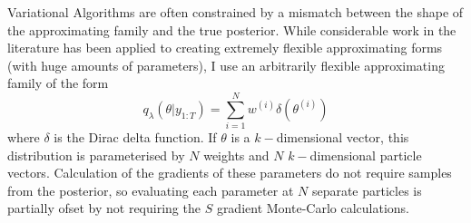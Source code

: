 \documentclass[
12pt, %
onehalfspacing, %
nohyperref, %
headsepline, %
chapterinoneline, %
]{MastersDoctoralThesis} %
\begin{document}
Variational Algorithms are often constrained by a mismatch between the shape of the approximating family and the true posterior. While considerable work in the literature has been applied to creating extremely flexible approximating forms (with huge amounts of parameters), I use an arbitrarily flexible approximating family of the form
\begin{equation}
\label{Particle:Q}
q_{\lambda}(\theta | y_{1:T}) = \sum_{i=1}^N w^{(i)} \delta(\theta^{(i)})
\end{equation}
where $\delta$ is the Dirac delta function. If $\theta$ is a $k-$dimensional vector, this distribution is parameterised by $N$ weights and $N$ $k-$dimensional particle vectors. Calculation of the gradients of these parameters do not require samples from the posterior, so evaluating each parameter at $N$ separate particles is partially ofset by not requiring the $S$ gradient Monte-Carlo calculations. 
\\
\end{document}
